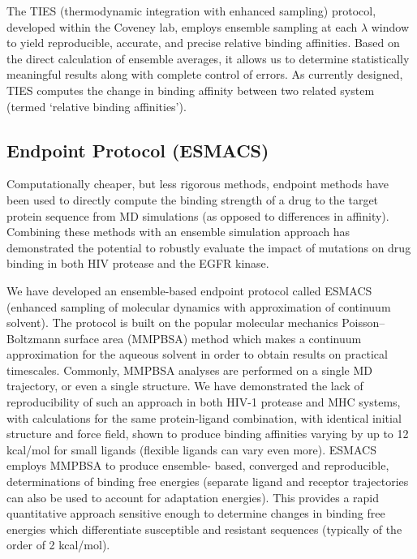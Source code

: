\documentclass[conference]{IEEEtran}
\begin{document}
The TIES (thermodynamic integration with enhanced sampling) protocol, developed within the Coveney lab, employs ensemble sampling at each $\lambda$ window to yield reproducible, accurate, and precise relative binding affinities. \cite{ Wan2017brd4} Based on the direct calculation of ensemble averages, it allows us to determine statistically meaningful results along with complete control of errors. As currently designed, TIES computes the change in binding affinity between two related system (termed ‘relative binding affinities’).


\subsection{Endpoint Protocol (ESMACS)}\label{sec:esmacs}

Computationally cheaper, but less rigorous methods, endpoint methods have been used to directly compute the binding strength of a drug to the target protein sequence from MD simulations (as opposed to differences in affinity). Combining these methods with an ensemble simulation approach has demonstrated the potential to robustly evaluate the impact of mutations on drug binding in both HIV protease \cite{Wright2014} and the EGFR kinase. \cite{Wan2011}

We have developed an ensemble-based endpoint protocol called ESMACS (enhanced sampling of molecular dynamics with approximation of continuum solvent). The protocol is built on the popular molecular mechanics Poisson–Boltzmann surface area (MMPBSA) \cite{MAssova1999} method which makes a continuum approximation for the aqueous solvent in order to obtain results on practical timescales. Commonly, MMPBSA analyses are performed on a single MD trajectory, or even a single structure. We have demonstrated the lack of reproducibility of such an approach in both HIV-1 protease and MHC systems, with calculations for the same protein-ligand combination, with identical initial structure and force field, shown to produce binding affinities varying by up to 12 kcal/mol for small ligands (flexible ligands can vary even more). \cite{Wan2015} ESMACS employs MMPBSA to produce ensemble- based, converged and reproducible, determinations of binding free energies (separate ligand and receptor trajectories can also be used to account for adaptation energies). This provides a rapid quantitative approach sensitive enough to determine changes in binding free energies which differentiate susceptible and resistant sequences (typically of the order of 2 kcal/mol).
\end{document}
